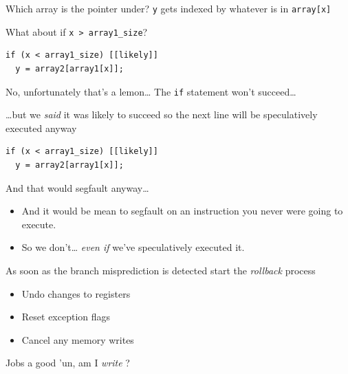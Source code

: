 \documentclass[9pt,aspectratio=169]{beamer}
\begin{document}
\begin{frame}[label={sec:org519314e},fragile]{Which array is the pointer under?}
 \texttt{y} gets indexed by whatever is in \texttt{array[x]}

What about if \texttt{x > array1\_size}?
\begin{verbatim}
if (x < array1_size) [[likely]]
  y = array2[array1[x]];
\end{verbatim}
\end{frame}

\begin{frame}[label={sec:org811b678},fragile]{No, unfortunately that's a lemon\ldots{}}
 The \texttt{if} statement won't succeed\ldots{}

\ldots{}but we \emph{said} it was likely to succeed so the next line will be speculatively executed anyway

\begin{verbatim}
if (x < array1_size) [[likely]]
  y = array2[array1[x]];
\end{verbatim}

And that would segfault anyway\ldots{}
\begin{itemize}
\item And it would be mean to segfault on an instruction you never were going to execute.
\item So we don't\ldots{} \emph{even if} we've speculatively executed it.
\end{itemize}

As soon as the branch misprediction is detected start the \emph{rollback} process
\begin{itemize}
\item Undo changes to registers
\item Reset exception flags
\item Cancel any memory writes
\end{itemize}

\begin{block}{Jobs a good 'un, am I \emph{write} ?}
\end{block}
\end{frame}
\end{document}
